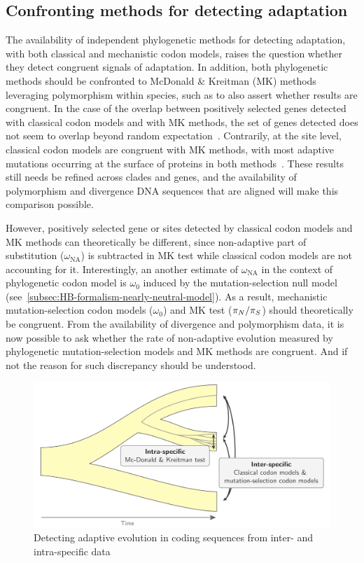 \subsection{Confronting methods for detecting adaptation}
\label{subsec:confronting-methods-for-detecting-adaptation}

The availability of independent phylogenetic methods for detecting adaptation, with both classical and mechanistic codon models, raises the question whether they detect congruent signals of adaptation.
In addition, both phylogenetic methods should be confronted to McDonald \& Kreitman (MK) methods leveraging polymorphism within species, such as to also assert whether results are congruent.
In the case of the overlap between positively selected genes detected with classical codon models and with MK methods, the set of genes detected does not seem to overlap beyond random expectation~\citep{He2020}.
Contrarily, at the site level, classical codon models are congruent with MK methods, with most adaptive mutations occurring at the surface of proteins in both methods~\citep{Moutinho2019}.
These results still needs be refined across clades and genes, and the availability of polymorphism and divergence DNA sequences that are aligned will make this comparison possible.

However, positively selected gene or sites detected by classical codon models and MK methods can theoretically be different, since non-adaptive part of substitution ($\omega_{\text{NA}}$) is subtracted in MK test while classical codon models are not accounting for it.
Interestingly, an another estimate of $\omega_{\text{NA}}$ in the context of phylogenetic codon model is $\omega_0$ induced by the mutation-selection null model (see~\ref{subsec:HB-formalism-nearly-neutral-model}).
As a result, mechanistic mutation-selection codon models ($\omega_0$) and MK test ($\pi_N / \pi_S$) should theoretically be congruent.
From the availability of divergence and polymorphism data, it is now possible to ask whether the rate of non-adaptive evolution measured by phylogenetic mutation-selection models and MK methods are congruent.
And if not the reason for such discrepancy should be understood.

\begin{figure}[H]
    \centering
    \includegraphics[width=\textwidth] {figures/inter-intra}
    \caption{Detecting adaptive evolution in coding sequences from inter- and intra-specific data}
    \label{fig:detecting-adaptation-inter-intra}
\end{figure}

